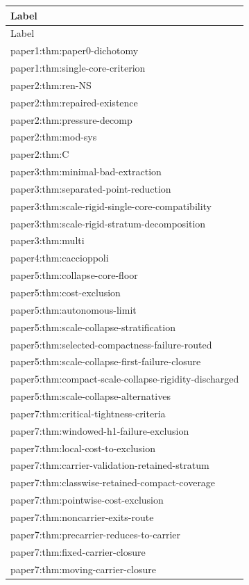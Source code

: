 \documentclass[11pt]{amsart}
\begin{document}
\begin{longtable}{@{}>{\ttfamily\footnotesize\raggedright\arraybackslash}p{}@{}}
\toprule
Label\\
\midrule
\endfirsthead
\toprule
Label\\
\midrule
\endhead
paper1:thm:paper0-dichotomy\\
paper1:thm:single-core-criterion\\
paper2:thm:ren-NS\\
paper2:thm:repaired-existence\\
paper2:thm:pressure-decomp\\
paper2:thm:mod-sys\\
paper2:thm:C\\
paper3:thm:minimal-bad-extraction\\
paper3:thm:separated-point-reduction\\
paper3:thm:scale-rigid-single-core-compatibility\\
paper3:thm:scale-rigid-stratum-decomposition\\
paper3:thm:multi\\
paper4:thm:caccioppoli\\
paper5:thm:collapse-core-floor\\
paper5:thm:cost-exclusion\\
paper5:thm:autonomous-limit\\
paper5:thm:scale-collapse-stratification\\
paper5:thm:selected-compactness-failure-routed\\
paper5:thm:scale-collapse-first-failure-closure\\
paper5:thm:compact-scale-collapse-rigidity-discharged\\
paper5:thm:scale-collapse-alternatives\\
paper7:thm:critical-tightness-criteria\\
paper7:thm:windowed-h1-failure-exclusion\\
paper7:thm:local-cost-to-exclusion\\
paper7:thm:carrier-validation-retained-stratum\\
paper7:thm:classwise-retained-compact-coverage\\
paper7:thm:pointwise-cost-exclusion\\
paper7:thm:noncarrier-exits-route\\
paper7:thm:precarrier-reduces-to-carrier\\
paper7:thm:fixed-carrier-closure\\
paper7:thm:moving-carrier-closure\\

\end{longtable}
\end{document}

